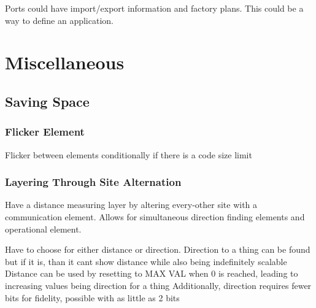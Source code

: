 \documentclass[article,12pt,oneside]{memoir}
\begin{document}
Ports could have import/export information and factory plans.
This could be a way to define an application.



\pagebreak
\chapter{Miscellaneous}

\section{Saving Space}


\subsection{Flicker Element}

Flicker between elements conditionally if there is a code size limit


\subsection{Layering Through Site Alternation}

Have a distance measuring layer by altering every-other site with a communication element.
Allows for simultaneous direction finding elements and operational element.

Have to choose for either distance or direction.
Direction to a thing can be found but if it is, than it cant show distance while also being indefinitely scalable
Distance can be used by resetting to MAX VAL when 0 is reached, leading to increasing values being direction for a thing
Additionally, direction requires fewer bits for fidelity, possible with as little as 2 bits
\end{document}
